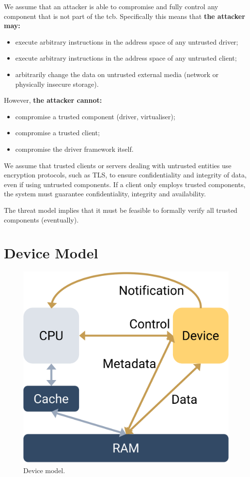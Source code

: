 \documentclass[a4paper,12pt]{report}
\newcommand{\figscale}{0.2}
\begin{document}
We assume that an attacker is able to compromise and fully control any
component that is not part of the \gls{tcb}. Specifically this means that
\textbf{the attacker may:}
\begin{itemize}
\item execute arbitrary instructions in the address
  space of any untrusted driver;
\item execute arbitrary instructions in the address
  space of any untrusted client;
\item arbitrarily change the data on untrusted external media
  (network or physically insecure storage).
\end{itemize}

However, \textbf{the attacker cannot:}
\begin{itemize}
\item compromise a trusted component (driver, virtualiser);
\item compromise a trusted client;
\item compromise the driver framework itself.
\end{itemize}

We assume that trusted clients or servers dealing with untrusted
entities use encryption protocols, such as TLS, to ensure
confidentiality and integrity of data, even if using untrusted
components. If a client only employs trusted components,
the system must guarantee confidentiality, integrity and availability.

The threat model implies that it must be feasible to formally verify
all trusted components (eventually).

\chapter{Device Model}\label{s:device}

\begin{figure}[th]
  \centering
  \includegraphics[scale=\figscale]{device}
  \caption{Device model.}
  \label{f:device}
\end{figure}
\end{document}
